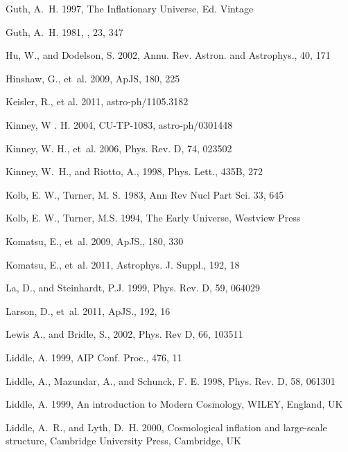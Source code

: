 \documentclass{rmaa}
\begin{document}
\begin{thebibliography}
Guth, A.~H. 1997, The Inflationary Universe,  Ed. Vintage
        
Guth, A.~H. 1981, \prd, 23,  347 

Hu, W., and {Dodelson,} S. 2002, Annu. Rev. Astron. and Astrophys., 40, 171 
 
Hinshaw, G., et~al. 2009, ApJS, 180, 225

  Keisler, R., et al. 2011, astro-ph/1105.3182  
 
  Kinney, W . H. 2004, CU-TP-1083, astro-ph/0301448
 
 Kinney, W. H.,  et~al. 2006, Phys. Rev. D, 74, 023502

 Kinney, W.~H., and {Riotto}, A.,  1998, Phys. Lett., 435B, 272

Kolb, E. W., Turner, M. S. 1983, Ann Rev Nucl Part Sci. 33, 645
  
Kolb, E. W., Turner, M.S. 1994, The Early Universe, Westview Press  

  Komatsu, E., et~al. 2009, ApJS., 180, 330 
  
Komatsu, E., et~al. 2011, Astrophys. J. Suppl., 192, 18

  La, D., and {Steinhardt}, P.J.  1999, Phys. Rev. D, 59, 064029
 
Larson, D., et~al. 2011, ApJS., 192, 16

Lewis A., and Bridle, S., 2002, Phys. Rev D, 66, 103511 
   
  Liddle, A. 1999, AIP Conf. Proc., 476, 11

 Liddle, A.,  {Mazundar,} A., and {Schunck,} F. E. 1998, Phys. Rev. D, 58, 061301  

Liddle, A. 1999, An introduction to Modern Cosmology, WILEY, England, UK

 Liddle, A.~R., and  Lyth, D.~H. 2000, Cosmological inflation and large-scale structure,
  Cambridge University Press, Cambridge, UK 


\end{thebibliography}
\end{document}
